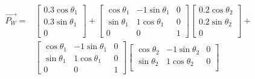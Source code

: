 \documentclass[conference]{IEEEtran}
\begin{document}
\begin{small}
    \begin{align*}
        \vec{\mathbf{\mathit{P_W}}} = & \begin{bmatrix}
                                            0.3\cos\theta_1 \\
                                            0.3\sin\theta_1 \\
                                            0
                                        \end{bmatrix} +     \begin{bmatrix}
                                                                \cos \theta_1 & - 1 \sin \theta_1 & 0 \\
                                                                \sin \theta_1 & 1 \cos \theta_1   & 0 \\
                                                                0             & 0                 & 1
                                                            \end{bmatrix}     \begin{bmatrix}
                                                                                  0.2 \cos \theta_2 \\
                                                                                  0.2 \sin \theta_2 \\
                                                                                  0
                                                                              \end{bmatrix} +                \\
                                      & \begin{bmatrix}
                                            \cos \theta_1 & - 1 \sin \theta_1 & 0 \\
                                            \sin \theta_1 & 1 \cos \theta_1   & 0 \\
                                            0             & 0                 & 1
                                        \end{bmatrix} \begin{bmatrix}
                                                          \cos \theta_2 & - 1 \sin \theta_2 & 0 \\
                                                          \sin \theta_2 & 1 \cos \theta_2   & 0 \\

\end{bmatrix}
\end{align*}
\end{small}
\end{document}
